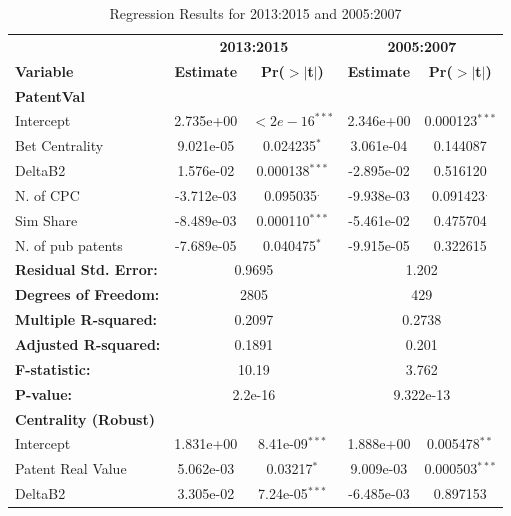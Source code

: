 \documentclass[12pt]{article}
\begin{document}
\begin{table}[h!]
\centering
\caption{Regression Results for 2013:2015 and 2005:2007}
\label{tab:regression_comparison}
\begin{tabular}{lcccc}
\toprule
 & \multicolumn{2}{c}{\textbf{2013:2015}} & \multicolumn{2}{c}{\textbf{2005:2007}} \\
\cmidrule(lr){2-3} \cmidrule(lr){4-5}
\textbf{Variable} & \textbf{Estimate} & \textbf{Pr($>|$t$|$)} & \textbf{Estimate} & \textbf{Pr($>|$t$|$)} \\
\midrule
\textbf{PatentVal} & & & & \\
Intercept         & 2.735e+00 & $<2e-16^{***}$ & 2.346e+00 & 0.000123$^{***}$ \\
Bet Centrality         & 9.021e-05 & 0.024235$^{*}$ & 3.061e-04 & 0.144087 \\
DeltaB2                & 1.576e-02 & 0.000138$^{***}$ & -2.895e-02 & 0.516120 \\
N. of CPC           & -3.712e-03 & 0.095035$^{.}$ & -9.938e-03 & 0.091423$^{.}$ \\
Sim Share         & -8.489e-03 & 0.000110$^{***}$ & -5.461e-02 & 0.475704 \\
N. of pub patents              & -7.689e-05 & 0.040475$^{*}$ & -9.915e-05 & 0.322615 \\
\midrule
\multicolumn{1}{l}{\textbf{Residual Std. Error:}} & \multicolumn{2}{c}{0.9695} & \multicolumn{2}{c}{1.202} \\
\multicolumn{1}{l}{\textbf{Degrees of Freedom:}} & \multicolumn{2}{c}{2805} & \multicolumn{2}{c}{429} \\
\multicolumn{1}{l}{\textbf{Multiple R-squared:}} & \multicolumn{2}{c}{0.2097} & \multicolumn{2}{c}{0.2738} \\
\multicolumn{1}{l}{\textbf{Adjusted R-squared:}} & \multicolumn{2}{c}{0.1891 } & \multicolumn{2}{c}{0.201 } \\
\multicolumn{1}{l}{\textbf{F-statistic:}} & \multicolumn{2}{c}{10.19} & \multicolumn{2}{c}{3.762} \\
\multicolumn{1}{l}{\textbf{P-value:}} & \multicolumn{2}{c}{2.2e-16} & \multicolumn{2}{c}{9.322e-13} \\
\midrule
\textbf{Centrality (Robust)} & & & & \\
Intercept         & 1.831e+00 & 8.41e-09$^{***}$ & 1.888e+00 & 0.005478$^{**}$ \\
Patent Real Value          & 5.062e-03 & 0.03217$^{*}$ & 9.009e-03 & 0.000503$^{***}$ \\
DeltaB2              & 3.305e-02 & 7.24e-05$^{***}$ & -6.485e-03 & 0.897153 \\

\end{tabular}
\end{table}
\end{document}
